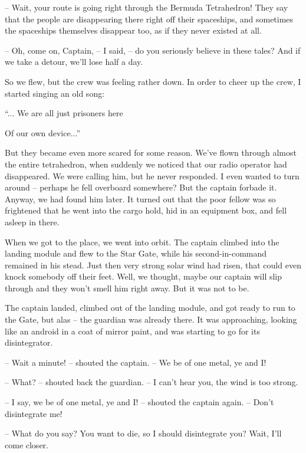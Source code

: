 \documentclass[ebook,oneside,final,openright]{memoir}
\begin{document}
– Wait, your route is going right through the Bermuda Tetrahedron! They say that the people are disappearing there right off their spaceships, and sometimes the spaceships themselves disappear too, as if they never existed at all.\par
– Oh, come on, Captain, – I said, – do you seriously believe in these tales? And if we take a detour, we’ll lose half a day.\par
\par
So we flew, but the crew was feeling rather down. In order to cheer up the crew, I started singing an old song: \par
 “... We are all just prisoners here \par
 Of our own device...” \par
 But they became even more scared for some reason. We’ve flown through almost the entire tetrahedron, when suddenly we noticed that our radio operator had disappeared. We were calling him, but he never responded. I even wanted to turn around – perhaps he fell overboard somewhere? But the captain forbade it. Anyway, we had found him later. It turned out that the poor fellow was so frightened that he went into the cargo hold, hid in an equipment box, and fell asleep in there.\par
\par
When we got to the place, we went into orbit. The captain climbed into the landing module and flew to the Star Gate, while his second-in-command remained in his stead. Just then very strong solar wind had risen, that could even knock somebody off their feet. Well, we thought, maybe our captain will slip through and they won’t smell him right away. But it was not to be.\par
\par
The captain landed, climbed out of the landing module, and got ready to run to the Gate, but alas – the guardian was already there. It was approaching, looking like an android in a coat of mirror paint, and was starting to go for its disintegrator.\par
– Wait a minute! – shouted the captain. – We be of one metal, ye and I!\par
– What? – shouted back the guardian. – I can’t hear you, the wind is too strong.\par
– I say, we be of one metal, ye and I! – shouted the captain again. – Don’t disintegrate me!\par
– What do you say? You want to die, so I should disintegrate you? Wait, I’ll come closer.\par
\end{document}

